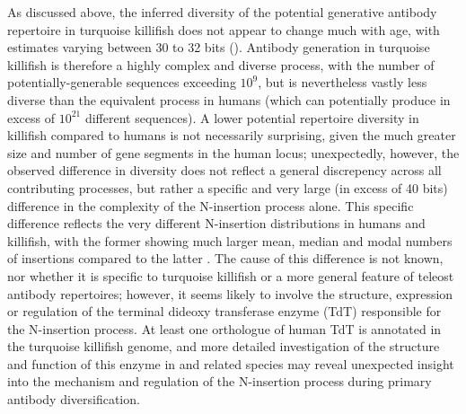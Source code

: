 As discussed above, the inferred diversity of the potential generative antibody repertoire in turquoise killifish does not appear to change much with age, with estimates varying between 30 to 32 bits (). Antibody generation in turquoise killifish is therefore a highly complex and diverse process, with the number of potentially-generable sequences exceeding $10^9$, but is nevertheless  vastly less diverse than the equivalent process in humans (which can potentially produce in excess of $10^{21}$ different sequences). A lower potential repertoire diversity in killifish compared to humans is not necessarily surprising, given the much greater size and number of gene segments in the human \igh{} locus; unexpectedly, however, the observed difference in diversity does not reflect a general discrepency across all contributing processes, but rather a specific and very large (in excess of 40 bits) difference in the complexity of the N-insertion process alone. This specific difference reflects the very different N-insertion distributions in humans and killifish, with the former showing much larger mean, median and modal numbers of insertions compared to the latter \parencite{elhanati2015model}. The cause of this difference is not known, nor whether it is specific to turquoise killifish or a more general feature of teleost antibody repertoires; however, it seems likely to involve the structure, expression or regulation of the terminal dideoxy transferase enzyme (TdT) responsible for the N-insertion process. At least one orthologue of human TdT is annotated in the turquoise killifish genome, and more detailed investigation of the structure and function of this enzyme in \nfu and related species may reveal unexpected insight into the mechanism and regulation of the N-insertion process during primary antibody diversification.

